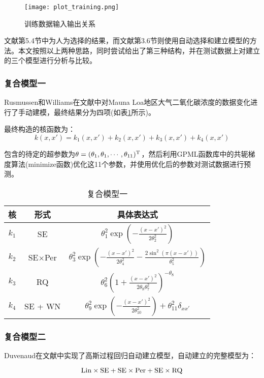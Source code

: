 \documentclass[10pt,twocolumn]{article}
\begin{document}
\begin{figure}[!htbp]
    \centering
    \texttt{[image: plot\_training.png]}
    \caption{训练数据输入输出关系}
    \label{plottrain}
\end{figure}


文献\cite{GPML}第5.4节中为人为选择的结果，而文献\cite{Auto2}第3.6节则使用自动选择和建立模型的方法。本文按照以上两种思路，同时尝试给出了第三种结构，并在测试数据上对建立的三个模型进行分析与比较。

\subsubsection{复合模型一}
Rusmussen和Williams在文献\cite{GPML}中对Mauna Loa地区大气二氧化碳浓度的数据变化进行了手动建模，最终结果分为四项(如表\ref{comp1}所示)。

最终构造的核函数为：
\[k(x,x') = k_{1}(x,x') + k_{2}(x,x') + k_{3}(x,x')
+ k_{4}(x,x')\]

包含的待定的超参数为$\mathbf{\theta} = (\theta_{1},\theta_{1},\cdots,\theta_{11})^{\rm T} $，然后利用GPML函数库中的共轭梯度算法(minimize函数)优化这11个参数，并使用优化后的参数对测试数据进行预测。

\begin{table}[!htbp]
\centering
\begin{tabular}{c|c|c}
\hline\hline
核 & 形式 & 具体表达式\\ \hline
$k_{1}$ & SE & $\theta_{1}^{2}\exp\left(-\frac{(x-x')^2}{2\theta_{2}^{2}}\right)$ \\ 
$k_{2}$ & SE$\times$Per & $\theta_{3}^{2}\exp\left(-\frac{(x-x')^2}{2\theta_{4}^2}-\frac{2\sin^2(\pi(x-x'))}{\theta_{5}^2}\right)$  \\
$k_{3}$ & RQ & $ \theta_{6}^2\left(1+\frac{(x-x')^2}{2\theta_{8}\theta_{7}^2}\right)^{-\theta_{8}} $  \\
$k_{4}$ & SE + WN & $ \theta_{9}^2\exp\left(-\frac{(x-x')^2}{2\theta_{10}^2}\right)+\theta_{11}^2\delta_{xx'} $  \\
\hline\hline
\end{tabular}
\caption{复合模型一}
\label{comp1}
\end{table}

\subsubsection{复合模型二}
Duvenaud在文献\cite{struct}中实现了高斯过程回归自动建立模型，自动建立的完整模型为：

\[\rm{Lin \times SE + SE \times  Per + SE \times RQ}\]
\end{document}

